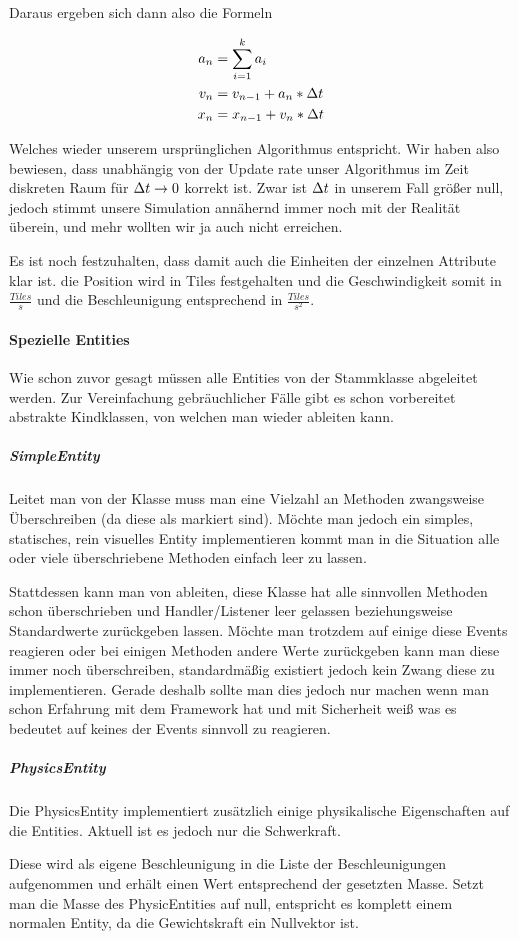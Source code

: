 Daraus ergeben sich dann also die Formeln

\begin{align*}
  a_n &= \sum_{i=1}^{k}{a_i}  \\
  v_n &= v_{n-1} + a_n * \Delta t  \\
  x_n &= x_{n-1} + v_n * \Delta t
\end{align*}

Welches wieder unserem ursprünglichen Algorithmus entspricht. Wir haben also bewiesen, dass unabhängig von der Update rate unser Algorithmus im Zeit diskreten Raum für $\Delta t \rightarrow 0$ korrekt ist. Zwar ist $\Delta t $ in unserem Fall größer null, jedoch stimmt unsere Simulation annähernd immer noch mit der Realität überein, und mehr wollten wir ja auch nicht erreichen.

Es ist noch festzuhalten, dass damit auch die Einheiten der einzelnen Attribute klar ist. die Position wird in Tiles festgehalten und die Geschwindigkeit somit in $\frac{Tiles}{s}$ und die Beschleunigung entsprechend in $\frac{Tiles}{s^2}$.

\paragraph{Spezielle Entities}

Wie schon zuvor gesagt müssen alle Entities von der Stammklasse  abgeleitet werden. Zur Vereinfachung gebräuchlicher Fälle gibt es schon vorbereitet abstrakte Kindklassen, von welchen man wieder ableiten kann.


\subparagraph{SimpleEntity}

Leitet man von der Klasse  muss man eine Vielzahl an Methoden zwangsweise Überschreiben (da diese als  markiert sind). Möchte man jedoch ein simples, statisches, rein visuelles Entity implementieren kommt man in die Situation alle oder viele überschriebene Methoden einfach leer zu lassen.

Stattdessen kann man von  ableiten, diese Klasse hat alle sinnvollen Methoden schon überschrieben und Handler/Listener leer gelassen beziehungsweise Standardwerte zurückgeben lassen. Möchte man trotzdem auf einige diese Events reagieren oder bei einigen Methoden andere Werte zurückgeben kann man diese immer noch überschreiben, standardmäßig existiert jedoch kein Zwang diese zu implementieren.
Gerade deshalb sollte man dies jedoch nur machen wenn man schon Erfahrung mit dem Framework hat und mit Sicherheit weiß was es bedeutet auf keines der Events sinnvoll zu reagieren.

\subparagraph{PhysicsEntity}

Die PhysicsEntity implementiert zusätzlich einige physikalische Eigenschaften auf die Entities. Aktuell ist es jedoch nur die Schwerkraft.

Diese wird als eigene Beschleunigung in die Liste der Beschleunigungen aufgenommen und erhält einen Wert entsprechend der gesetzten Masse. Setzt man die Masse des PhysicEntities auf null, entspricht es komplett einem normalen Entity, da die Gewichtskraft ein Nullvektor ist.